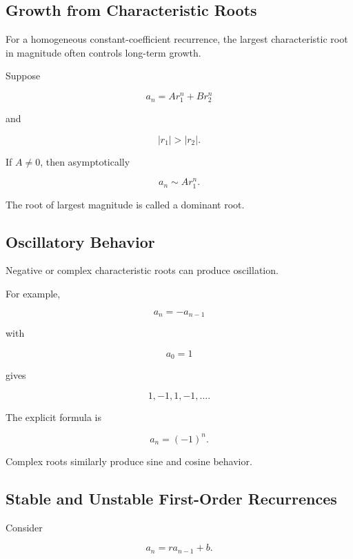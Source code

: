 \subsection{Growth from Characteristic Roots}
\label{subsec:growth-characteristic-roots}

For a homogeneous constant-coefficient recurrence, the largest
characteristic root in magnitude often controls long-term growth.

Suppose

\[
a_n
=
A r_1^n
+
B r_2^n
\]

and

\[
|r_1|>|r_2|.
\]

If \(A\neq0\), then asymptotically

\[
\boxed{
a_n
\sim
A r_1^n.
}
\]

The root of largest magnitude is called a dominant root.

\subsection{Oscillatory Behavior}
\label{subsec:oscillatory-recurrences}

Negative or complex characteristic roots can produce oscillation.

For example,

\[
a_n=-a_{n-1}
\]

with

\[
a_0=1
\]

gives

\[
1,-1,1,-1,\ldots.
\]

The explicit formula is

\[
\boxed{
a_n=(-1)^n.
}
\]

Complex roots similarly produce sine and cosine behavior.

\subsection{Stable and Unstable First-Order Recurrences}
\label{subsec:stable-unstable-recurrences}

Consider

\[
a_n=ra_{n-1}+b.
\]

